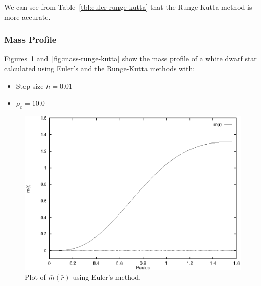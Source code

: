 \documentclass[a4paper]{IEEEtran}
\begin{document}
    We can see from Table~\ref{tbl:euler-runge-kutta} 
    that the Runge-Kutta method is more accurate.

    \subsubsection{Mass Profile}
    Figures~\ref{fig:mass-euler} and~\ref{fig:mass-runge-kutta}
    show the mass profile of a white dwarf star 
    calculated using Euler's and the Runge-Kutta methods with:
    \begin{itemize}
        \item Step size $h = 0.01$
        \item $\rho_c = 10.0$
    \end{itemize}

    \begin{figure}
    \caption{Plot of $\bar{m}(\bar{r})$ using Euler's method.} 
    \label{fig:mass-euler} 
    \begin{center}
        \includegraphics[width=\columnwidth]{figures/mass-euler-01}
    \end{center}
    \end{figure} 
\end{document}
